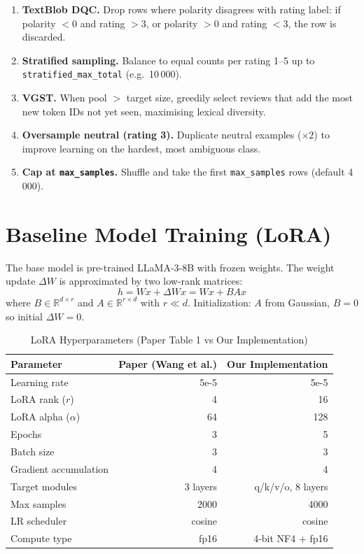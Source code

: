 \documentclass[12pt,a4paper]{article}
\begin{document}
\begin{enumerate}[leftmargin=*]
  \item \textbf{TextBlob DQC.} Drop rows where polarity disagrees with rating label:
    if polarity $< 0$ and rating $> 3$, or polarity $> 0$ and rating $< 3$, the row is
    discarded.

  \item \textbf{Stratified sampling.} Balance to equal counts per rating 1--5 up to
    \texttt{stratified\_max\_total} (e.g.\ 10\,000).

  \item \textbf{VGST.} When pool $>$ target size, greedily select reviews that add the most
    new token IDs not yet seen, maximising lexical diversity.

  \item \textbf{Oversample neutral (rating 3).} Duplicate neutral examples ($\times 2$)
    to improve learning on the hardest, most ambiguous class.

  \item \textbf{Cap at \texttt{max\_samples}.} Shuffle and take the first
    \texttt{max\_samples} rows (default 4\,000).
\end{enumerate}

\section{Baseline Model Training (LoRA)}

The base model is pre-trained LLaMA-3-8B with frozen weights. The weight update $\Delta W$
is approximated by two low-rank matrices:
\[
  h = Wx + \Delta W x = Wx + BAx
\]
where $B \in \mathbb{R}^{d \times r}$ and $A \in \mathbb{R}^{r \times d}$ with $r \ll d$.
Initialization: $A$ from Gaussian, $B = 0$ so initial $\Delta W = 0$.

\begin{table}[H]
\centering
\caption{LoRA Hyperparameters (Paper Table 1 vs Our Implementation)}
\begin{tabular}{lrr}
\toprule
\textbf{Parameter} & \textbf{Paper (Wang et al.)} & \textbf{Our Implementation} \\
\midrule
Learning rate         & 5e-5  & 5e-5 \\
LoRA rank ($r$)       & 4     & 16 \\
LoRA alpha ($\alpha$) & 64    & 128 \\
Epochs                & 3     & 5 \\
Batch size            & 3     & 3 \\
Gradient accumulation & 4     & 4 \\
Target modules        & 3 layers & q/k/v/o, 8 layers \\
Max samples           & 2000  & 4000 \\
LR scheduler          & cosine & cosine \\
Compute type          & fp16  & 4-bit NF4 + fp16 \\
\bottomrule
\end{tabular}
\end{table}
\end{document}
